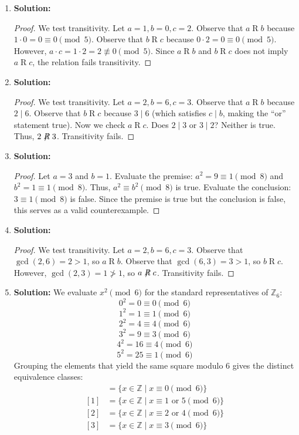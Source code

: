 \documentclass[11pt, a4paper]{article}
\theoremstyle{definition}
\theoremstyle{remark}
\newcommand{\Z}{\mathbb{Z}}
\begin{document}
\begin{enumerate}[label=\textbf{\arabic*.}]
    \item \textbf{Solution:}
    \begin{proof}
    We test transitivity. Let $a = 1, b = 0, c = 2$. 
    Observe that $a \mathrel{R} b$ because $1 \cdot 0 = 0 \equiv 0 \pmod{5}$. 
    Observe that $b \mathrel{R} c$ because $0 \cdot 2 = 0 \equiv 0 \pmod{5}$. 
    However, $a \cdot c = 1 \cdot 2 = 2 \not\equiv 0 \pmod{5}$. 
    Since $a \mathrel{R} b$ and $b \mathrel{R} c$ does not imply $a \mathrel{R} c$, the relation fails transitivity.
    \end{proof}

    \item \textbf{Solution:}
    \begin{proof}
    We test transitivity. Let $a = 2, b = 6, c = 3$.
    Observe that $a \mathrel{R} b$ because $2 \mid 6$.
    Observe that $b \mathrel{R} c$ because $3 \mid 6$ (which satisfies $c \mid b$, making the ``or'' statement true).
    Now we check $a \mathrel{R} c$. Does $2 \mid 3$ or $3 \mid 2$? Neither is true. 
    Thus, $2 \not\mathrel{R} 3$. Transitivity fails.
    \end{proof}

    \item \textbf{Solution:}
    \begin{proof}
    Let $a = 3$ and $b = 1$. 
    Evaluate the premise: $a^2 = 9 \equiv 1 \pmod{8}$ and $b^2 = 1 \equiv 1 \pmod{8}$. Thus, $a^2 \equiv b^2 \pmod{8}$ is true.
    Evaluate the conclusion: $3 \equiv 1 \pmod{8}$ is false. 
    Since the premise is true but the conclusion is false, this serves as a valid counterexample.
    \end{proof}

    \item \textbf{Solution:}
    \begin{proof}
    We test transitivity. Let $a = 2, b = 6, c = 3$.
    Observe that $\gcd(2, 6) = 2 > 1$, so $a \mathrel{R} b$.
    Observe that $\gcd(6, 3) = 3 > 1$, so $b \mathrel{R} c$.
    However, $\gcd(2, 3) = 1 \not> 1$, so $a \not\mathrel{R} c$. Transitivity fails.
    \end{proof}

    \item \textbf{Solution:}
    We evaluate $x^2 \pmod{6}$ for the standard representatives of $\Z_6$:
    \[ 0^2 = 0 \equiv 0 \pmod{6} \]
    \[ 1^2 = 1 \equiv 1 \pmod{6} \]
    \[ 2^2 = 4 \equiv 4 \pmod{6} \]
    \[ 3^2 = 9 \equiv 3 \pmod{6} \]
    \[ 4^2 = 16 \equiv 4 \pmod{6} \]
    \[ 5^2 = 25 \equiv 1 \pmod{6} \]
    Grouping the elements that yield the same square modulo 6 gives the distinct equivalence classes:
    \begin{align*}
        [0] &= \{x \in \Z \mid x \equiv 0 \pmod{6}\} \\
        [1] &= \{x \in \Z \mid x \equiv 1 \text{ or } 5 \pmod{6}\} \\
        [2] &= \{x \in \Z \mid x \equiv 2 \text{ or } 4 \pmod{6}\} \\
        [3] &= \{x \in \Z \mid x \equiv 3 \pmod{6}\}
    \end{align*}


\end{enumerate}
\end{document}
